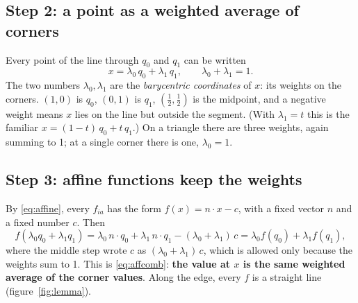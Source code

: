 \documentclass[11pt,a4paper]{article}
\theoremstyle{remark}
\begin{document}
\subsection{Step 2: a point as a weighted average of corners}

Every point of the line through $q_0$ and $q_1$ can be written
\[
  x = \lambda_0\, q_0 + \lambda_1\, q_1, \qquad \lambda_0 + \lambda_1 = 1 .
\]
The two numbers $\lambda_0, \lambda_1$ are the \emph{barycentric coordinates} of $x$: its weights
on the corners. $(1,0)$ is $q_0$, $(0,1)$ is $q_1$, $(\tfrac12,\tfrac12)$ is the midpoint, and a
negative weight means $x$ lies on the line but outside the segment. (With $\lambda_1 = t$ this is
the familiar $x = (1-t)\,q_0 + t\,q_1$.) On a triangle there are three weights, again summing to
1; at a single corner there is one, $\lambda_0 = 1$.

\subsection{Step 3: affine functions keep the weights}

By \eqref{eq:affine}, every $f_{ia}$ has the form $f(x) = n\cdot x - c$, with a fixed vector $n$
and a fixed number $c$. Then
\[
  f(\lambda_0 q_0 + \lambda_1 q_1)
  = \lambda_0\, n\cdot q_0 + \lambda_1\, n\cdot q_1 - (\lambda_0 + \lambda_1)\,c
  = \lambda_0 f(q_0) + \lambda_1 f(q_1),
\]
where the middle step wrote $c$ as $(\lambda_0 + \lambda_1)\,c$, which is allowed only because the
weights sum to 1. This is \eqref{eq:affcomb}: \textbf{the value at $x$ is the same weighted
average of the corner values}. Along the edge, every $f$ is a straight line
(figure~\ref{fig:lemma}).
\end{document}
